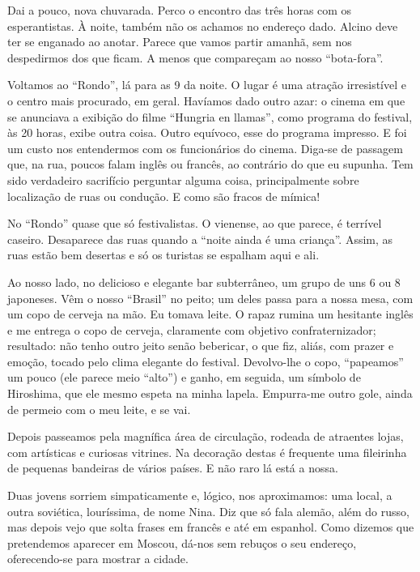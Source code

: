 Dai a pouco, nova chuvarada. Perco o encontro das três horas com os esperantistas. À noite, também não os achamos no endereço dado. Alcino deve ter se enganado ao anotar. Parece que vamos partir amanhã, sem nos despedirmos dos que ficam. A menos que compareçam ao nosso ``bota-fora''.

Voltamos ao ``Rondo'', lá para as 9 da noite. O lugar é uma atração irresistível e o centro mais procurado, em geral. Havíamos dado outro azar: o cinema em que se anunciava a exibição do filme ``Hungria en llamas'', como programa do festival, às 20 horas, exibe outra coisa. Outro equívoco, esse do programa impresso. E foi um custo nos entendermos com os funcionários do cinema. Diga-se de passagem que, na rua, poucos falam inglês ou francês, ao contrário do que eu supunha. Tem sido verdadeiro sacrifício perguntar alguma coisa, principalmente sobre localização de ruas ou condução. E como são fracos de mímica!

No ``Rondo'' quase que só festivalistas. O vienense, ao que parece, é terrível caseiro. Desaparece das ruas quando a ``noite ainda é uma criança''. Assim, as ruas estão bem desertas e só os turistas se espalham aqui e ali.

Ao nosso lado, no delicioso e elegante bar subterrâneo, um grupo de uns 6 ou 8 japoneses. Vêm o nosso ``Brasil'' no peito; um deles passa para a nossa mesa, com um copo de cerveja na mão. Eu tomava leite. O rapaz rumina um hesitante inglês e me entrega o copo de cerveja, claramente com objetivo confraternizador; resultado: não tenho outro jeito senão bebericar, o que fiz, aliás, com prazer e emoção, tocado pelo clima elegante do festival. Devolvo-lhe o copo, ``papeamos'' um pouco (ele parece meio ``alto'') e ganho, em seguida, um símbolo de Hiroshima, que ele mesmo espeta na minha lapela. Empurra-me outro gole, ainda de permeio com o meu leite, e se vai.

Depois passeamos pela magnífica área de circulação, rodeada de atraentes lojas, com artísticas e curiosas vitrines. Na decoração destas é frequente uma fileirinha de pequenas bandeiras de vários países. E não raro lá está a nossa.

Duas jovens sorriem simpaticamente e, lógico, nos aproximamos: uma local, a outra soviética, louríssima, de nome Nina. Diz que só fala alemão, além do russo, mas depois vejo que solta frases em francês e até em espanhol. Como dizemos que pretendemos aparecer em Moscou, dá-nos sem rebuços o seu endereço, oferecendo-se para mostrar a cidade.

